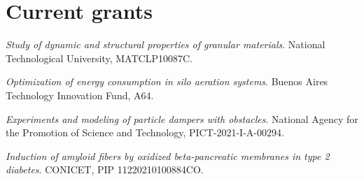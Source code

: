 \section{Current grants}
 \textit{Study of dynamic and structural properties of granular materials}. National Technological University, MATCLP10087C.

 \textit{Optimization of energy consumption in silo aeration systems}. Buenos Aires Technology Innovation Fund, A64.

 \textit{Experiments and modeling of particle dampers with obstacles}. National Agency for the Promotion of Science and Technology, PICT-2021-I-A-00294.

 \textit{Induction of amyloid fibers by oxidized beta-pancreatic membranes in type 2 diabetes}. CONICET, PIP 11220210100884CO.

